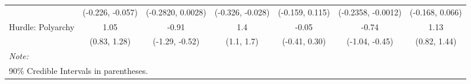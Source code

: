 \begin{table}[H]
\begin{tabular}[t]{lcccccc}
 & (-0.226, -0.057) & (-0.2820, 0.0028) & (-0.326, -0.028) & (-0.159, 0.115) & (-0.2358, -0.0012) & (-0.168, 0.066)\\
Hurdle: Polyarchy & 1.05 & -0.91 & 1.4 & -0.05 & -0.74 & 1.13\\
 & (0.83, 1.28) & (-1.29, -0.52) & (1.1, 1.7) & (-0.41, 0.30) & (-1.04, -0.45) & (0.82, 1.44)\\
\bottomrule
\multicolumn{7}{l}{\rule{0pt}{1em}\textit{Note: }}\\
\multicolumn{7}{l}{\rule{0pt}{1em}90\% Credible Intervals in parentheses.}\\
\end{tabular}
\end{table}
